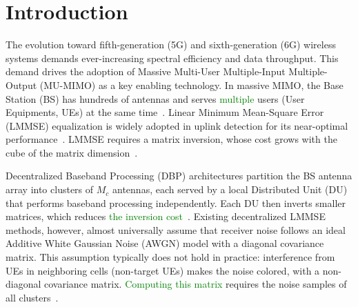 \chapter{Introduction}\label{chap:introducao}

The evolution toward fifth-generation (5G) and sixth-generation (6G) wireless
systems demands ever-increasing spectral efficiency and data throughput. This demand drives
the adoption of Massive Multi-User Multiple-Input Multiple-Output (MU-MIMO) as
a key enabling technology. In massive MIMO, the Base Station (BS) has hundreds of antennas and serves \textcolor{GREEN}{multiple} users (User Equipments, UEs) at the same time~\cite{decentralized2017,jeon2019}.
Linear Minimum
Mean-Square Error (LMMSE) equalization is widely adopted in uplink detection for its near-optimal
performance~\cite{zhao2025jsac}. LMMSE requires a matrix inversion, whose cost grows with the cube of the matrix dimension~\cite{li-tradeofs}.

Decentralized Baseband Processing (DBP) architectures partition
the BS antenna array into clusters of $M_c$ antennas, each served by a local
Distributed Unit (DU) that performs baseband processing independently. Each DU then inverts smaller matrices, which reduces \textcolor{GREEN}{the inversion cost}~\cite{decentralized2017,jeon2019}. Existing decentralized
LMMSE methods, however, almost universally assume that receiver noise follows an ideal
Additive White Gaussian Noise (AWGN) model with a diagonal covariance matrix.
This assumption typically does not hold in practice: interference from UEs in neighboring cells (non-target UEs) makes the noise colored, with a non-diagonal covariance matrix.
\textcolor{GREEN}{Computing this matrix} requires the noise samples of all clusters~\cite{zhao2021-globecom,zhao2025jsac}.

